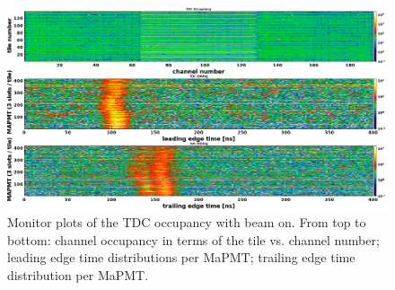 \documentclass[5p,times,twocolumn]{elsarticle}
\begin{document}
\begin{figure}[t]
\begin{center}
\includegraphics[width=1.0\columnwidth]{TDC_BeamOn.png}
\end{center}
\caption{Monitor plots of the TDC occupancy with beam on. From top to bottom: channel occupancy in terms of the
  tile vs. channel number; leading edge time distributions per MaPMT; trailing edge time distribution per MaPMT.}
\label{fig:Online_TDC}
\end{figure}



\end{document}
